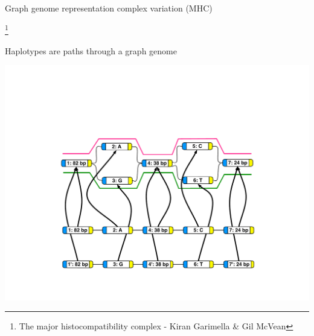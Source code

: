 \documentclass[10pt,
               hyperref={bookmarks=false,
                         bookmarksopen=false,
                         colorlinks=true,
                         linkcolor=blue,
                         urlcolor=blue},
               xcolor={svgnames,table}]{beamer}
\newcommand\blfootnote[1]{%
  \begingroup
  \renewcommand\thefootnote{}\footnote{#1}%
  \addtocounter{footnote}{-1}%
  \endgroup
}
\begin{document}
\begin{frame}{Graph genome representation complex variation (MHC)}
  \begin{center}
    \end{center}
  \blfootnote{The major histocompatibility complex - Kiran Garimella \& Gil McVean}
\end{frame}

\begin{frame}{Haplotypes are paths through a graph genome}
  \begin{center}
    \includegraphics[scale=0.50]{images/graph-genome-haplotypes.pdf}
  \end{center}
\end{frame}
\end{document}
